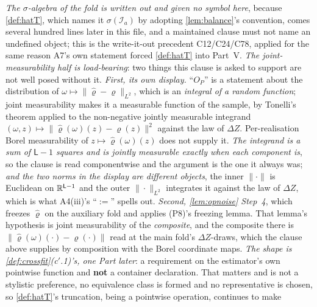 \medskip
\noindent
\emph{The $\sigma$-algebra of the fold is written out and given no symbol here}, because
\cref{def:hatT}, which names it $\sigma(\mathcal I_a)$ by adopting \cref{lem:balance}'s convention, 
comes several hundred lines later in this file, and a maintained clause must not name an undefined object;
this is the write-it-out precedent C12/C24/C78, applied for the same reason A7's own statement forced
\cref{def:hatT} into Part~V.
\emph{The joint-measurability half is load-bearing}: two things this clause is asked to support are not
well posed without it.
\emph{First, its own display.} ``$O_P$'' is a statement about the distribution of
$\omega\mapsto\|\hat\varrho-\varrho\|_{L^2}$, which is an \emph{integral of a random function}; joint
measurability makes it a measurable function of the sample, by Tonelli's theorem applied to the
non-negative jointly measurable integrand $(\omega,z)\mapsto\|\hat\varrho(\omega)(z)-\varrho(z)\|^{2}$
against the law of $\Delta Z$. Per-realisation Borel measurability of $z\mapsto\hat\varrho(\omega)(z)$
does not supply it. \emph{The integrand is a sum of $\mathsf L-1$ squares and is jointly measurable
exactly when each component is}, so the clause is read componentwise and the argument is the one it
always was; \emph{and the two norms in the display are different objects}, the inner
$\|\cdot\|$ is Euclidean on $\mathbb{R}^{\mathsf L-1}$ and the outer $\|\cdot\|_{L^2}$ integrates it against
the law of $\Delta Z$, which is what A4(iii)'s ``$:=$'' spells out.
\emph{Second, \cref{lem:opnoise} Step~4}, which freezes $\hat\varrho$ on the auxiliary fold and applies
\textup{(P8)}'s freezing lemma. That lemma's hypothesis is joint measurability of the \emph{composite},
and the composite there is $\|\hat\varrho(\omega)(\cdot)-\varrho(\cdot)\|$ read at the main fold's
$\Delta Z$-draws, which the clause above supplies by composition with the Borel coordinate maps.
\emph{The shape is \cref{def:crossfit}\textup{(c$'$.1)}'s, one Part later}: a requirement on the
estimator's own pointwise function and \textbf{not} a container declaration. That matters and is not a
stylistic preference, no equivalence class is formed and no representative is chosen, so
\cref{def:hatT}'s truncation, being a pointwise operation, continues to make
